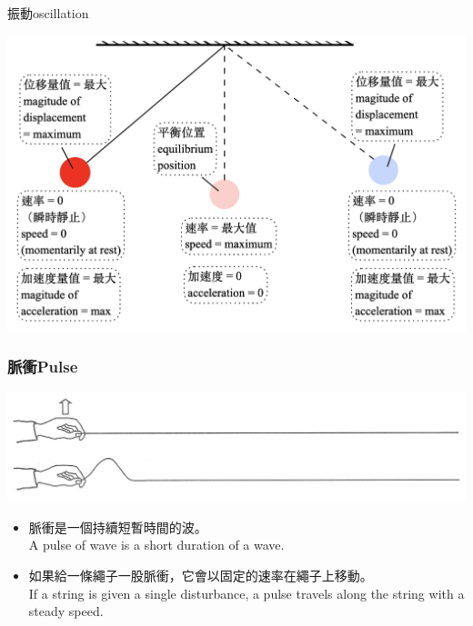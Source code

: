 \documentclass[beamer=true]{standalone}
\begin{document}
\begin{frame}{振動oscillation}
    \par{\par\centering\includegraphics[width=\textwidth]{./img/ch1_2024-05-03-17-43-13.png}\par}
\end{frame}

\begin{frame}
    \frametitle{脈衝Pulse}
    \par{\par\centering\includegraphics[width=.8\textwidth]{./img/ch1_2024-05-06-19-34-01.png}\par}
    \bigskip \bigskip
    \begin{itemize}
        \item 脈衝是一個持續短暫時間的波。\\A pulse of wave is a short duration of a wave.
        \item 如果給一條繩子一股脈衝，它會以固定的速率在繩子上移動。\\If a string is given a single disturbance, a pulse travels along the string with a steady speed.
    \end{itemize}
\end{frame}
\end{document}
